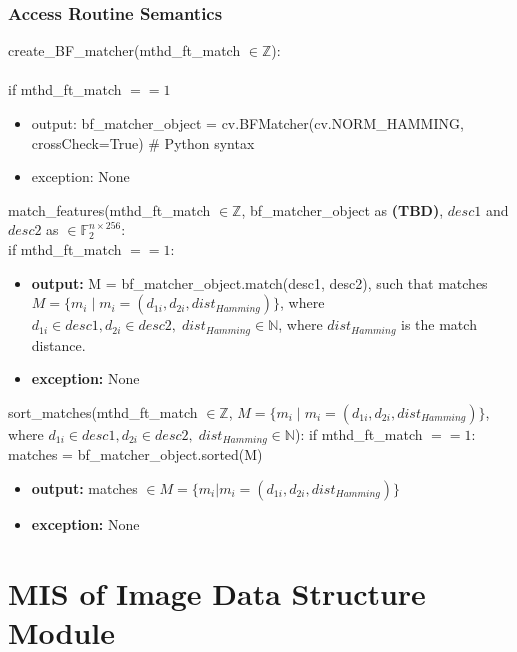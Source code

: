 \documentclass[12pt, titlepage]{article}
\begin{document}
\subsubsection{Access Routine Semantics}

create\_BF\_matcher(mthd\_ft\_match $\in \mathbb{Z}$):\\ \\
if mthd\_ft\_match $== 1$
\begin{itemize}
  \item output: bf\_matcher\_object = cv.BFMatcher(cv.NORM\_HAMMING, crossCheck=True) 
  \# Python syntax
  \item exception: None
\end{itemize} 
match\_features(mthd\_ft\_match $\in \mathbb{Z}$, bf\_matcher\_object as \textbf{(TBD)},  
$desc1$ and $desc2$ as $\in \mathbb{F}_{2}^{n\times 256}$:\\
if mthd\_ft\_match $== 1$:
\begin{itemize}
  \item \textbf{output:} M = bf\_matcher\_object.match(desc1, desc2), such that \newline
  matches $M = \{ m_i \mid m_i = (d_{1i}, d_{2i}, dist_{Hamming})\}$, where $d_{1i} 
  \in desc1, d_{2i} \in desc2, \; dist_{Hamming} \in \mathbb{N}$, 
  where $dist_{Hamming}$ is the match distance.
  \item \textbf{exception:} None
\end{itemize}
sort\_matches(mthd\_ft\_match $\in \mathbb{Z}$, $M = \{ m_i \mid m_i = (d_{1i}, d_{2i}, 
dist_{Hamming})\}$, where $d_{1i} 
  \in desc1, d_{2i} \in desc2, \; dist_{Hamming} \in \mathbb{N}$): \newline
if mthd\_ft\_match $== 1$: \newline
matches = bf\_matcher\_object.sorted(M) 
\begin{itemize}
  \item \textbf{output:} matches $\in M = \{m_i | m_i = (d_{1i}, d_{2i}, dist_{Hamming})\}$
  \item \textbf{exception:} None
\end{itemize}


\section{MIS of Image Data Structure Module} \label{mIDS}

\end{document}
